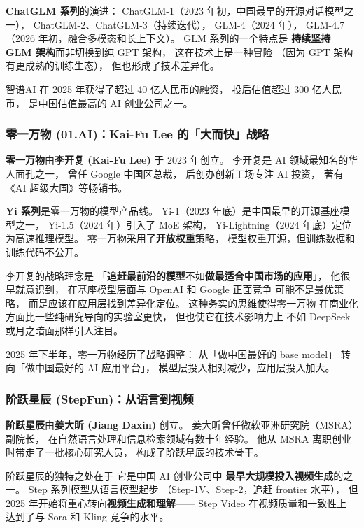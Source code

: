 \textbf{ChatGLM 系列}的演进：
ChatGLM-1（2023 年初，中国最早的开源对话模型之一），
ChatGLM-2、ChatGLM-3（持续迭代），
GLM-4（2024 年），
GLM-4.7（2026 年初，融合多模态和长上下文）。
GLM 系列的一个特点是
\textbf{持续坚持 GLM 架构}而非切换到纯 GPT 架构，
这在技术上是一种冒险
（因为 GPT 架构有更成熟的训练生态），
但也形成了技术差异化。

智谱AI 在 2025 年获得了超过 40 亿人民币的融资，
投后估值超过 300 亿人民币，
是中国估值最高的 AI 创业公司之一。

\subsubsection{零一万物 (01.AI)：Kai-Fu Lee 的「大而快」战略}

\textbf{零一万物}由\textbf{李开复 (Kai-Fu Lee)} 于 2023 年创立。
李开复是 AI 领域最知名的华人面孔之一，
曾任 Google 中国区总裁，
后创办创新工场专注 AI 投资，
著有《AI 超级大国》等畅销书。

\textbf{Yi 系列}是零一万物的模型产品线。
Yi-1（2023 年底）是中国最早的开源基座模型之一，
Yi-1.5（2024 年）引入了 MoE 架构，
Yi-Lightning（2024 年底）定位为高速推理模型。
零一万物采用了\textbf{开放权重}策略，
模型权重开源，但训练数据和训练代码不公开。

李开复的战略理念是
「\textbf{追赶最前沿的模型}不如\textbf{做最适合中国市场的应用}」，
他很早就意识到，
在基座模型层面与 OpenAI 和 Google 正面竞争
可能不是最优策略，
而是应该在应用层找到差异化定位。
这种务实的思维使得零一万物
在商业化方面比一些纯研究导向的实验室更快，
但也使它在技术影响力上
不如 DeepSeek 或月之暗面那样引人注目。

2025 年下半年，零一万物经历了战略调整：
从「做中国最好的 base model」
转向「做中国最好的 AI 应用平台」，
模型层投入相对减少，应用层投入加大。

\subsubsection{阶跃星辰 (StepFun)：从语言到视频}

\textbf{阶跃星辰}由\textbf{姜大昕 (Jiang Daxin)} 创立。
姜大昕曾任微软亚洲研究院（MSRA）副院长，
在自然语言处理和信息检索领域有数十年经验。
他从 MSRA 离职创业时带走了一批核心研究人员，
构成了阶跃星辰的技术骨干。

阶跃星辰的独特之处在于
它是中国 AI 创业公司中
\textbf{最早大规模投入视频生成}的之一。
Step 系列模型从语言模型起步
（Step-1V、Step-2，追赶 frontier 水平），
但 2025 年开始将重心转向\textbf{视频生成和理解}——
Step Video 在视频质量和一致性上
达到了与 Sora 和 Kling 竞争的水平。

